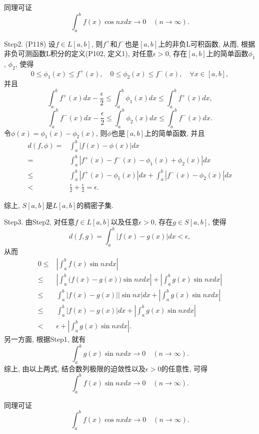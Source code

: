 \documentclass[UTF8,oneside,12pt]{article}  %
\makeatletter
\theoremstyle{DingLi1}
\numberwithin{equation}{section}
\theoremstyle{DingLi2}
\renewenvironment{proof}[1][\proofname]{\par%
\pushQED{\qed}%
\normalfont \topsep6\p@\@plus6\p@\relax%
\trivlist%
\item[\hskip\labelsep%
#1]\ignorespaces%
}{%
\popQED\endtrivlist\@endpefalse%
}
\renewcommand{\proofname}{\heiti\large\color{blue} 证明}%
\makeatother
\begin{document}
\begin{proof}
同理可证
$$\int_a^b f(x)\cos nx dx\to 0\quad (n\to\infty). $$

Step2. (P118) 设$f\in L[a,b]$, 则$f^+$和$f^-$也是$[a,b]$上的非负L可积函数, 从而, 根据非负可测函数L积分的定义(P102, 定义1), 对任意$\epsilon>0$, 存在$[a,b]$上的简单函数$\phi_1$, $\phi_2$, 使得
$$0\leq \phi_1(x)\leq f^+(x),\quad 0\leq \phi_2(x)\leq f^-(x),\quad \forall x\in [a,b],$$
并且
$$\int_a^b f^+(x)dx-\frac{\epsilon}{2}\leq\int_a^b \phi_1(x) dx\leq \int_a^b f^+(x)dx,$$
$$\int_a^b f^-(x)dx-\frac{\epsilon}{2}\leq\int_a^b \phi_2(x) dx\leq \int_a^b f^-(x)dx.$$
令$\phi(x)=\phi_1(x)-\phi_2(x)$, 则$\phi$也是$[a,b]$上的简单函数, 并且
$$
\begin{aligned}
d(f,\phi)=&\int_a^b |f(x)-\phi(x)| dx\\
=&\int_a^b |f^+(x)-f^-(x)-\phi_1(x)+\phi_2(x)|dx\\
\leq&\int_a^b|f^+(x)-\phi_1(x)|dx+\int_a^b |f^-(x)-\phi_2(x)|dx\\
<&\frac{\epsilon}{2}+\frac{\epsilon}{2}=\epsilon.
\end{aligned}
$$

综上, $S[a,b]$是$L[a,b]$的稠密子集.

Step3. 由Step2, 对任意$f\in L[a,b]$以及任意$\epsilon>0$, 存在$g\in S[a,b]$, 使得
$$d(f,g)=\int_a^b|f(x)-g(x)|dx<\epsilon,$$
从而
$$
\begin{aligned}
0\leq&\left|\int_a^b f(x)\sin nx dx\right|\\
\leq&\left|\int_a^b \big(f(x)-g(x)\big)\sin nx dx\right|+\left|\int_a^b g(x)\sin nx dx\right|\\
\leq&\int_a^b \left|f(x)-g(x)\right||\sin nx| dx+\left|\int_a^b g(x)\sin nx dx\right|\\
\leq&\int_a^b \left|f(x)-g(x)\right| dx+\left|\int_a^b g(x)\sin nx dx\right|\\
<&\epsilon+\left|\int_a^b g(x)\sin nx dx\right|.
\end{aligned}
$$
另一方面, 根据Step1, 就有
$$\int_a^b g(x)\sin nx dx \to 0\quad(n\to \infty).$$
综上, 由以上两式, 结合数列极限的迫敛性以及$\epsilon>0$的任意性, 可得
$$\int_a^b f(x)\sin nx dx\to 0\quad (n\to \infty).$$

同理可证
$$\int_a^b f(x)\cos nx dx\to 0\quad (n\to \infty).$$
\end{proof}
\end{document}
